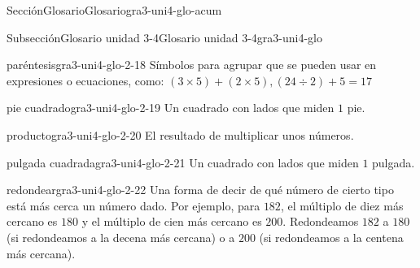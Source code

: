 \begin{sectionptx}{Sección}{Glosario}{}{Glosario}{}{}{gra3-uni4-glo-acum}
\begin{subsectionptx}{Subsección}{Glosario unidad 3-4}{}{Glosario unidad 3-4}{}{}{gra3-uni4-glo}
\begin{descriptionlist}
\begin{dlimedium}{paréntesis}{gra3-uni4-glo-2-18}
Símbolos para agrupar que se pueden usar en expresiones o ecuaciones, como: \((3 \times 5) + (2 \times 5), (24 \div 2) + 5 = 17\)%
\end{dlimedium}%
\begin{dlimedium}{pie cuadrado}{gra3-uni4-glo-2-19}%
Un cuadrado con lados que miden \(1\) pie.%
\end{dlimedium}%
\begin{dlimedium}{producto}{gra3-uni4-glo-2-20}%
El resultado de multiplicar unos números.%
\end{dlimedium}%
\begin{dlimedium}{pulgada cuadrada}{gra3-uni4-glo-2-21}%
Un cuadrado con lados que miden \(1\) pulgada.%
\end{dlimedium}%
\begin{dlimedium}{redondear}{gra3-uni4-glo-2-22}%
Una forma de decir de qué número de cierto tipo está más cerca un número dado. Por ejemplo, para \(182\), el múltiplo de diez más cercano es \(180\) y el múltiplo de cien más cercano es \(200\). Redondeamos \(182\) a \(180\) (si redondeamos a la decena más cercana) o a \(200\) (si redondeamos a la centena más cercana).%
\end{dlimedium}%
\end{descriptionlist}
\end{subsectionptx}
\end{sectionptx}
%
%
\typeout{************************************************}
\typeout{************************************************}
%
\small

